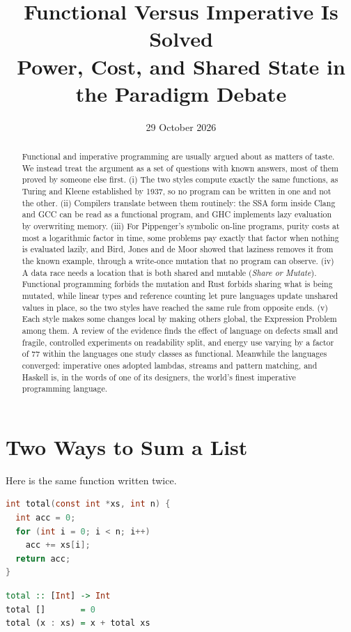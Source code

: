 \documentclass[11pt]{article}
\title{
  \textbf{Functional Versus Imperative Is Solved}\\[0.2em]
  \large Power, Cost, and Shared State in the Paradigm Debate
}
\author{}
\date{29 October 2026}
\let\oldsection\section
\renewcommand{\section}{\Needspace{0.25\textheight}\oldsection}
\theoremstyle{definition}
\theoremstyle{remark}
\begin{document}
\maketitle

\begin{abstract}
  Functional and imperative programming are usually argued about as
  matters of taste. We instead treat the argument as a set of questions
  with known answers, most of them proved by someone else first. (i) The
  two styles compute exactly the same functions, as Turing and Kleene
  established by 1937, so no program can be written in one and not the
  other. (ii) Compilers translate between them routinely: the SSA form
  inside Clang and GCC can be read as a functional program, and GHC
  implements lazy
  evaluation by overwriting memory. (iii) For Pippenger's symbolic
  on-line programs, purity costs at most a logarithmic factor in time,
  some problems pay exactly that factor when nothing is evaluated lazily,
  and Bird, Jones and de Moor showed that laziness removes it from the
  known example, through a write-once mutation that no program can
  observe. (iv) A data race needs a location that is both shared and
  mutable (\emph{Share or Mutate}). Functional programming forbids the
  mutation and Rust forbids sharing what is being mutated, while linear
  types and reference counting let pure languages update unshared values
  in place, so the two styles have reached the same rule from opposite
  ends. (v) Each style makes some changes local by making others global,
  the Expression Problem among them. A review of the evidence finds the
  effect of language on defects small and fragile, controlled
  experiments on readability split, and energy use varying by a factor of
  77 within the languages one study classes as functional. Meanwhile the
  languages converged: imperative ones adopted lambdas, streams and
  pattern matching, and Haskell is, in the words of one of its designers,
  the world's finest imperative programming language.
\end{abstract}

\section{Two Ways to Sum a List}\label{sec:defs}

Here is the same function written twice.

\noindent
\begin{minipage}[t]{0.5\textwidth}
  \begin{lstlisting}[language=C, caption={Imperative, in C.}, label=lst:c]
int total(const int *xs, int n) {
  int acc = 0;
  for (int i = 0; i < n; i++)
    acc += xs[i];
  return acc;
}
  \end{lstlisting}
\end{minipage}%
\begin{minipage}[t]{0.5\textwidth}
  \begin{lstlisting}[language=Haskell, caption={Functional, in Haskell.}, label=lst:hs]
total :: [Int] -> Int
total []       = 0
total (x : xs) = x + total xs
  \end{lstlisting}
\end{minipage}
\end{document}
